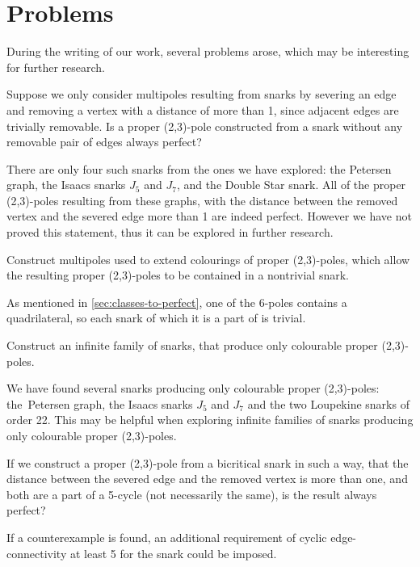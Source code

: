 \section{Problems}
\label{sec:problems}

During the writing of our work, several problems arose, which may be interesting for further research.

\begin{problem}
	Suppose we only consider multipoles resulting from snarks by severing an edge and removing a vertex with a distance of more than 1, since adjacent edges are trivially removable. Is a proper (2,3)-pole constructed from a snark without any removable pair of edges always perfect?
\end{problem}

There are only four such snarks from the ones we have explored: the Petersen graph, the Isaacs snarks $J_5$ and $J_7$, and the Double Star snark. All of the proper (2,3)-poles resulting from these graphs, with the distance between the removed vertex and the severed edge more than 1 are indeed perfect. However we have not proved this statement, thus it can be explored in further research.

\begin{problem}
	Construct multipoles used to extend colourings of proper (2,3)-poles, which allow the resulting proper (2,3)-poles to be contained in a nontrivial snark.
\end{problem}

As mentioned in \cref{sec:classes-to-perfect}, one of the 6-poles contains a quadrilateral, so each snark of which it is a part of is trivial.

\begin{problem}
	Construct an infinite family of snarks, that produce only colourable proper (2,3)-poles.
\end{problem}

We have found several snarks producing only colourable proper (2,3)-poles: the~Petersen graph, the Isaacs snarks $J_5$ and $J_7$ and the two Loupekine snarks of order 22. This may be helpful when exploring infinite families of snarks producing only colourable proper (2,3)-poles.

\begin{problem}
	If we construct a proper (2,3)-pole from a bicritical snark in such a way, that the distance between the severed edge and the removed vertex is more than one, and both are a part of a 5-cycle (not necessarily the same), is the result always perfect?
\end{problem}

If a counterexample is found, an additional requirement of cyclic edge-connectivity at least 5 for the snark could be imposed.